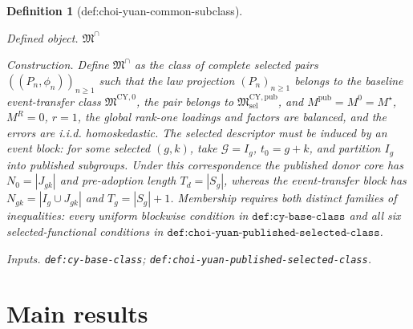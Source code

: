 \documentclass{article}
\newtheorem{definition}{Definition}
\begin{document}
\begin{definition}[def:choi-yuan-common-subclass]\label{def:choi-yuan-common-subclass}
\par\smallskip\noindent\emph{Defined object.} \(\mathfrak M^\cap\)
\par\smallskip\noindent\emph{Construction.} Define \(\mathfrak M^\cap\) as the class of complete selected pairs
\(((P_n,\phi_n))_{n\ge1}\) such that the law projection
\((P_n)_{n\ge1}\) belongs to the baseline event-transfer class
\(\mathfrak M^{\mathrm{CY},0}\), the pair belongs to
\(\mathfrak M^{\mathrm{CY,pub}}_{\mathrm{sel}}\), and
\(M^{\mathrm{pub}}=M^0=M^\star\), \(M^R=0\), \(r=1\), the global
rank-one loadings and factors are
balanced, and the errors are i.i.d. homoskedastic.  The selected
descriptor must be induced by an event block: for some selected
\((g,k)\), take \(\mathcal G=I_g\), \(t_0=g+k\), and partition
\(I_g\) into published subgroups.  Under this correspondence the
published donor core has \(N_0=|J_{gk}|\) and pre-adoption length
\(T_d=|S_g|\), whereas the event-transfer block has
\(N_{gk}=|I_g\cup J_{gk}|\) and \(T_g=|S_g|+1\).  Membership requires
both distinct families of inequalities: every uniform blockwise
condition in \(\texttt{def:cy-base-class}\) and all six selected-functional
conditions in \(\texttt{def:choi-yuan-published-selected-class}\).
\par\smallskip\noindent\emph{Inputs.} \texttt{def:\allowbreak{}cy-\allowbreak{}base-\allowbreak{}class}; \texttt{def:\allowbreak{}choi-\allowbreak{}yuan-\allowbreak{}published-\allowbreak{}selected-\allowbreak{}class}.
\end{definition}

\section{Main results}
\end{document}
